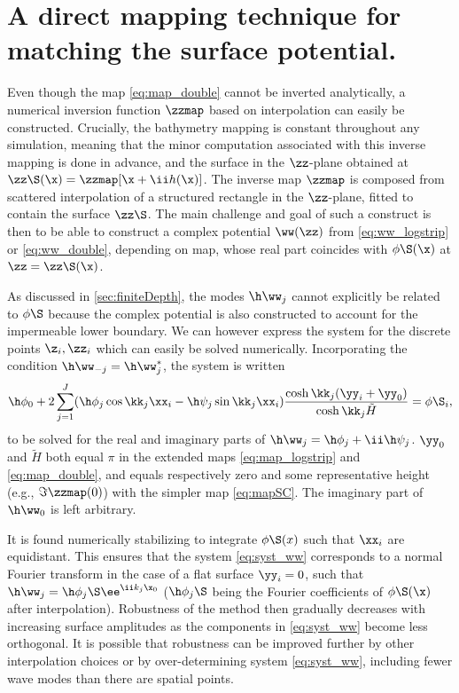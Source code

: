 




\section{A direct mapping technique for matching the surface potential.}
\label{sec:directMapping}
Even though the map \eqref{eq:map_double} cannot be inverted analytically, a numerical inversion function $\zzmap$ based on interpolation can easily be constructed. 
Crucially, the bathymetry mapping is constant throughout any simulation, meaning that the minor computation associated with this inverse mapping is done in advance, 
and the surface in the $\zz$-plane obtained at $\zz\S(\x)=\zzmap[\x+\ii h(\x)]$.
The inverse map $\zzmap$ is composed from scattered interpolation of a structured rectangle in the $\zz$-plane, fitted to contain the surface $\zz\S$.
The main challenge and goal of such a construct is then to be able to construct a complex potential $\ww(\zz)$ from \eqref{eq:ww_logstrip} or \eqref{eq:ww_double}, depending on map, whose real part coincides with $\phi\S(\x)$ at $\zz=\zz\S(\x)$.

As discussed in \autoref{sec:finiteDepth}, the modes $\h\ww_j$ cannot explicitly be related to $\phi\S$ because the complex potential is also constructed to account for the impermeable lower boundary. 
We can however express the system for the discrete points $\z_i,\zz_i$ which can easily be solved numerically.
Incorporating the condition $\h\ww_{-j}=\h\ww_{j}^*$, the system is written
\begin{equation}
\h\phi_0 + 2\sum_{j=1}^J (\h\phi_j \cos\kk_j \xx_i - \h\psi_j \sin\kk_j \xx_i )\frac{\cosh \kk_j(\yy_i+\yy_0)}{\cosh\kk_j\tilde H} = \phi\S_i,
\label{eq:syst_ww}
\end{equation}
to be solved for the real and imaginary parts of 
$\h\ww_j = \h\phi_j + \ii \h\psi_j$. 
$\yy_0$ and $\tilde H$ both equal $\pi$ in the extended maps \eqref{eq:map_logstrip} and \eqref{eq:map_double}, and equals respectively zero and some representative height (e.g., $\Im \zzmap(0)$) with the simpler map \eqref{eq:mapSC}.
The imaginary part of $\h\ww_0$ is left arbitrary.

It is found numerically stabilizing to integrate $\phi\S(x)$ such that $\xx_i$ are equidistant.  
This ensures that the system \eqref{eq:syst_ww} corresponds to a normal Fourier transform in the case of a flat surface $\yy_i=0$, such that $\h\ww_j = \h\phi_j\S \ee^{\ii k_j \x_0}$ ($\h\phi_j\S$ being the Fourier coefficients of $\phi\S(\x)$ after interpolation).
Robustness of the method then gradually decreases with increasing surface amplitudes as the components in \eqref{eq:syst_ww} become less orthogonal.
It is possible that robustness can be improved further by other interpolation choices or by over-determining system \eqref{eq:syst_ww}, including fewer wave modes than there are spatial points.
\\

